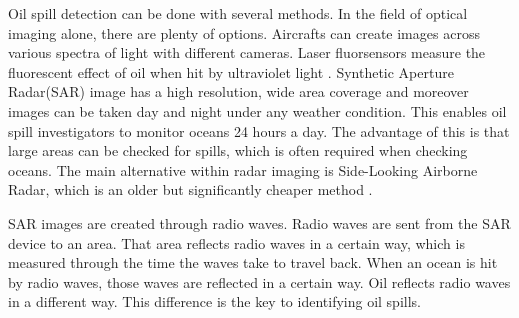 \hspace{0.5cm} Oil spill detection can be done with several methods. In the field of optical imaging alone, there are plenty of options. Aircrafts can create images across various spectra of light with different cameras. Laser fluorsensors measure the fluorescent effect of oil when hit by ultraviolet light \cite{fingas2014review}. Synthetic Aperture Radar(SAR) image has a high resolution, wide area coverage and moreover images can be taken day and night under any weather condition. This enables oil spill investigators to monitor oceans 24 hours a day\cite{Chang20081915}. The advantage of this is that large areas can be checked for spills, which is often required when checking oceans. The main alternative within radar imaging is Side-Looking Airborne Radar, which is an older but significantly cheaper method \cite{fingas2014review}. 

SAR images are created through radio waves. Radio waves are sent from the SAR device to an area. That area reflects radio waves in a certain way, which is measured through the time the waves take to travel back. \cite{Doerry:04} When an ocean is hit by radio waves, those waves are reflected in a certain way. Oil reflects radio waves in a different way. This difference is the key to identifying oil spills.




